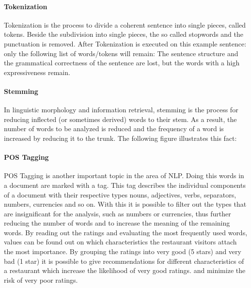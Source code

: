 \paragraph{Tokenization}
Tokenization is the process to divide a coherent sentence into single pieces, called tokens.
Beside the subdivision into single pieces, the so called stopwords and the punctuation is removed.
After Tokenization is executed on this example sentence:
\newline
{}
\newline
only the following list of words/tokens will remain:
\newline
{}
\newline
The sentence structure and the grammatical correctness of the sentence are lost, but the words with a high expressiveness remain.
\paragraph{Stemming}
In linguistic morphology and information retrieval, stemming is the process for reducing inflected (or sometimes derived) words to their stem.\cite{TextMiner14}
As a result, the number of words to be analyzed is reduced and the frequency of a word is increased by reducing it to the trunk.
The following figure illustrates this fact:
\paragraph{\acs{POS} Tagging}
\ac{POS} Tagging is another important topic in the area of \ac{NLP}.
Doing this words in a document are marked with a tag.
This tag describes the individual components of a document with their respective types \eg{} nouns, adjectives, verbs, separators, numbers, currencies and so on.
With this it is possible to filter out the types that are insignificant for the analysis, such as numbers or currencies, thus further reducing the number of words and
to increase the meaning of the remaining words.
\newline
By reading out the ratings and evaluating the most frequently used words, values can be found out on which characteristics the restaurant visitors attach the most importance.
By grouping the ratings into very good (5 stars) and very bad (1 star) it is possible to give recommendations for different characteristics of a restaurant which increase the likelihood of very good ratings.
and minimize the risk of very poor ratings.
